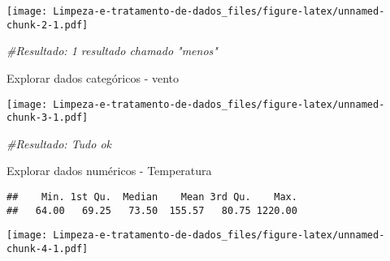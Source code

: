 \documentclass[
]{article}
\newenvironment{Shaded}{\begin{snugshade}}{\end{snugshade}}
\newcommand{\AttributeTok}[1]{\textcolor[rgb]{0.77,0.63,0.00}{#1}}
\newcommand{\CommentTok}[1]{\textcolor[rgb]{0.56,0.35,0.01}{\textit{#1}}}
\newcommand{\FunctionTok}[1]{\textcolor[rgb]{0.00,0.00,0.00}{#1}}
\newcommand{\NormalTok}[1]{#1}
\newcommand{\OtherTok}[1]{\textcolor[rgb]{0.56,0.35,0.01}{#1}}
\newcommand{\SpecialCharTok}[1]{\textcolor[rgb]{0.00,0.00,0.00}{#1}}
\newcommand{\StringTok}[1]{\textcolor[rgb]{0.31,0.60,0.02}{#1}}
\begin{document}
\texttt{[image: Limpeza-e-tratamento-de-dados\_files/figure-latex/unnamed-chunk-2-1.pdf]}

\begin{Shaded}
\begin{Highlighting}[]
\CommentTok{\#Resultado: 1 resultado chamado "menos"}
\end{Highlighting}
\end{Shaded}

Explorar dados categóricos - vento

\begin{Shaded}
\end{Shaded}

\texttt{[image: Limpeza-e-tratamento-de-dados\_files/figure-latex/unnamed-chunk-3-1.pdf]}

\begin{Shaded}
\begin{Highlighting}[]
\CommentTok{\#Resultado: Tudo ok}
\end{Highlighting}
\end{Shaded}

Explorar dados numéricos - Temperatura

\begin{Shaded}
\end{Shaded}

\begin{verbatim}
##    Min. 1st Qu.  Median    Mean 3rd Qu.    Max. 
##   64.00   69.25   73.50  155.57   80.75 1220.00
\end{verbatim}

\begin{Shaded}
\end{Shaded}

\texttt{[image: Limpeza-e-tratamento-de-dados\_files/figure-latex/unnamed-chunk-4-1.pdf]}
\end{document}
